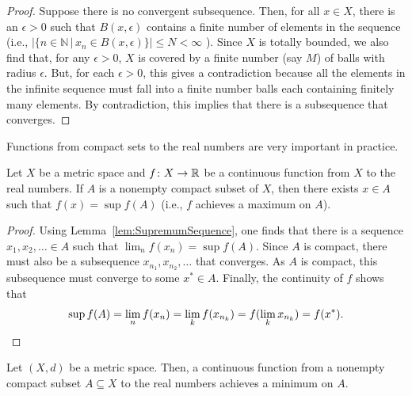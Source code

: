 \begin{proof}
Suppose there is no convergent subsequence.
Then, for all $x\in X$, there is an $\epsilon >0$ such that $B(x,\epsilon)$ contains a finite number of elements in the sequence (i.e., $|\{n\in \mathbb{N}\,|\,x_n \in B(x,\epsilon)\}| \leq N<\infty$ ).
Since $X$ is totally bounded, we also find that, for any $\epsilon >0$, $X$ is covered by a finite number (say $M$) of balls with radius $\epsilon$.
But, for each $\epsilon >0$, this gives a contradiction because all the elements in the infinite sequence must fall into a finite number balls each containing finitely many elements.
By contradiction, this implies that there is a subsequence that converges.
\fi
\end{proof}

Functions from compact sets to the real numbers are very important in practice.

\begin{theorem}
Let $X$ be a metric space and $f \colon X\rightarrow \mathbb{R}$ be a continuous function from $X$ to the real numbers.
If $A$ is a nonempty compact subset of $X$, then there exists $x\in A$ such that $f(x)=\sup f(A)$ (i.e., $f$ achieves a maximum on $A$).
\end{theorem}
\begin{proof}
Using Lemma~\ref{lem:SupremumSequence}, one finds that there is a sequence $x_1,x_2,\ldots \in A$ such that $\lim_n f(x_n) = \sup f(A)$.
Since $A$ is compact, there must also be a subsequence $x_{n_1},x_{n_2},\ldots$ that converges.
As $A$ is compact, this subsequence must converge to some $x^* \in A$.
Finally, the continuity of $f$ shows that
\[\sup f(A) = \lim_n f(x_n) = \lim_k f(x_{n_k}) = f(\lim_k x_{n_k}) = f(x^*). \qedhere \]
\end{proof}

\begin{corollary}
Let $(X,d)$ be a metric space.
Then, a continuous function from a nonempty compact subset $A\subseteq X$ to the real numbers achieves a minimum on $A$.
\end{corollary}




